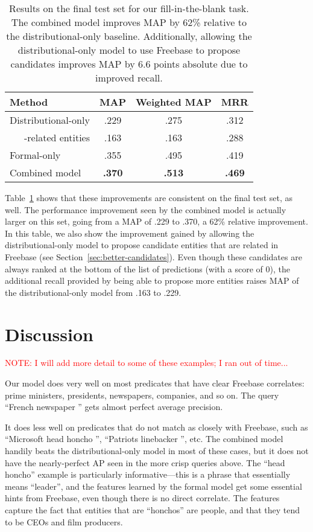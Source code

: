 \documentclass[11pt]{article}
\newcommand{\secref}[1]{Section~\ref{sec:#1}}
\newcommand{\tabref}[1]{Table~\ref{tab:#1}}
\newcommand{\mattnote}[1]{\textcolor{red}{NOTE: #1}}
\newcommand{\blank}{\underline{\hspace{.5cm}}}
\begin{document}
\begin{table}
  \centering
  {\small
    \begin{tabular}{lccc}
      \toprule
      Method & MAP & Weighted MAP & MRR \\
      \midrule
      Distributional-only & .229 & .275 & .312 \\
      \ \ \ -related entities & .163 & .163 & .288 \\
      \midrule
      Formal-only & .355 & .495 & .419 \\
      \midrule
      Combined model & \textbf{.370} & \textbf{.513} & \textbf{.469} \\
      \bottomrule
    \end{tabular}
  }
  \caption{Results on the final test set for our fill-in-the-blank task.  The
  combined model improves MAP by 62\% relative to the distributional-only
  baseline.  Additionally, allowing the distributional-only model to use
  Freebase to propose candidates improves MAP by 6.6 points absolute due to
  improved recall.}
  \label{tab:final-results}
\end{table}

\tabref{final-results} shows that these improvements are consistent on the
final test set, as well.  The performance improvement seen by the combined
model is actually larger on this set, going from a MAP of .229 to .370, a 62\%
relative improvement.  In this table, we also show the improvement gained by
allowing the distributional-only model to propose candidate entities that are
related in Freebase (see \secref{better-candidates}).  Even though these
candidates are always ranked at the bottom of the list of predictions (with a
score of 0), the additional recall provided by being able to propose more
entities raises MAP of the distributional-only model from .163 to .229.

\section{Discussion}
\label{sec:discussion}

\mattnote{I will add more detail to some of these examples; I ran out of
time...}

Our model does very well on most predicates that have clear Freebase
correlates: prime ministers, presidents, newspapers, companies, and so on.  The
query ``French newspaper \blank{}'' gets almost perfect average precision.

It does less well on predicates that do not match as closely with Freebase,
such as ``Microsoft head honcho \blank{}'', ``Patriots linebacker \blank{}'',
etc.  The combined model handily beats the distributional-only model in most of
these cases, but it does not have the nearly-perfect AP seen in the more crisp
queries above.  The ``head honcho'' example is particularly informative---this
is a phrase that essentially means ``leader'', and the features learned by the
formal model get some essential hints from Freebase, even though there is no
direct correlate.  The features capture the fact that entities that are
``honchos'' are people, and that they tend to be CEOs and film producers.
\end{document}
